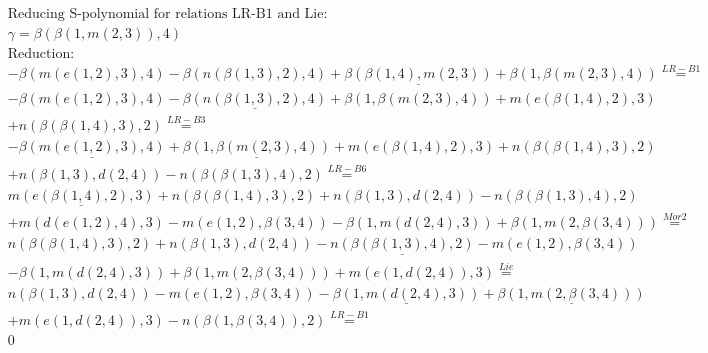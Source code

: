 \documentclass[11pt]{amsart}
\begin{document}
\begin{align*} 
& \text{Reducing S-polynomial for relations LR-B1 and Lie:} \\ 
& \gamma = \beta(\beta(1,m(2,3)),4) \\ 
& \text{Reduction}: \\& - \beta(m(e(1,2),3),4) - \beta(n(\beta(1,3),2),4) + \underline{\beta(\beta(1,4),m(2,3))} + \beta(1,\beta(m(2,3),4)) \stackrel{ LR-B1 }{=}  \\ 
& - \beta(m(e(1,2),3),4) - \underline{\beta(n(\beta(1,3),2),4)} + \beta(1,\beta(m(2,3),4)) + m(e(\beta(1,4),2),3)\\ 
 &  + n(\beta(\beta(1,4),3),2) \stackrel{ LR-B3 }{=}  \\ 
& - \underline{\beta(m(e(1,2),3),4)} + \underline{\beta(1,\beta(m(2,3),4))} + m(e(\beta(1,4),2),3) + n(\beta(\beta(1,4),3),2)\\ 
 &  + n(\beta(1,3),d(2,4)) - n(\beta(\beta(1,3),4),2) \stackrel{ LR-B6 }{=}  \\ 
&\underline{m(e(\beta(1,4),2),3)} + n(\beta(\beta(1,4),3),2) + n(\beta(1,3),d(2,4)) - n(\beta(\beta(1,3),4),2)\\ 
 &  + m(d(e(1,2),4),3) - m(e(1,2),\beta(3,4)) - \beta(1,m(d(2,4),3)) + \beta(1,m(2,\beta(3,4))) \stackrel{ Mor2 }{=}  \\ 
&n(\beta(\beta(1,4),3),2) + n(\beta(1,3),d(2,4)) - \underline{n(\beta(\beta(1,3),4),2)} - m(e(1,2),\beta(3,4))\\ 
 &  - \beta(1,m(d(2,4),3)) + \beta(1,m(2,\beta(3,4))) + m(e(1,d(2,4)),3) \stackrel{ Lie }{=}  \\ 
&n(\beta(1,3),d(2,4)) - m(e(1,2),\beta(3,4)) - \underline{\beta(1,m(d(2,4),3))} + \underline{\beta(1,m(2,\beta(3,4)))}\\ 
 &  + m(e(1,d(2,4)),3) - n(\beta(1,\beta(3,4)),2) \stackrel{ LR-B1 }{=}  \\ 
&0\\ 
\end{align*} 
 
\end{document}
